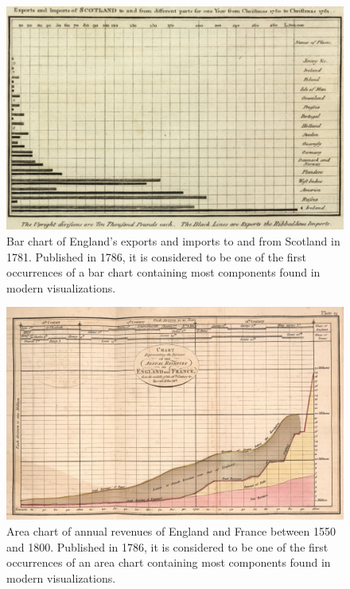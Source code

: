\begin{figure}[tp]
\centering
\includegraphics[keepaspectratio,width=\linewidth,height=\thirdh]
{images/playfair-bar-chart.png}
\caption[Bar Chart by William Playfair from 1786]{%
Bar chart of England's exports and imports to and from Scotland in
1781. Published in 1786, it is considered to be one of the first
occurrences of a bar chart containing most components found in modern
visualizations. }
\label{fig:PlayfairBarChart}
\end{figure}



\begin{figure}[tp]
\centering
\includegraphics[keepaspectratio,width=\linewidth,height=\thirdh]
{images/playfair-area-chart.png}
\caption[Area Chart by William Playfair from 1786]{%
Area chart of annual revenues of England and France between 1550 and
1800. Published in 1786, it is considered to be one of the first
occurrences of an area chart containing most components found in
modern visualizations. }
\label{fig:PlayfairAreaChart}
\end{figure}



